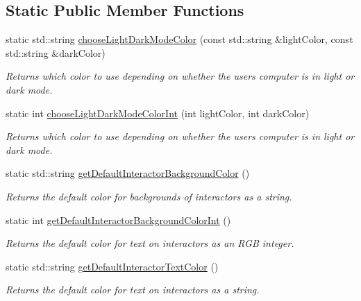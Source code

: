 \subsection*{Static Public Member Functions}
\begin{DoxyCompactItemize}
\item 
static std\+::string \mbox{\hyperlink{classsgl_1_1GWindow_a14da494e7a105db49b15cbd11db68774}{choose\+Light\+Dark\+Mode\+Color}} (const std\+::string \&light\+Color, const std\+::string \&dark\+Color)
\begin{DoxyCompactList}\small\item\em Returns which color to use depending on whether the user\textquotesingle{}s computer is in light or dark mode. \end{DoxyCompactList}\item 
static int \mbox{\hyperlink{classsgl_1_1GWindow_a8364f5a4c8622d07ccc83bdc3acc4f19}{choose\+Light\+Dark\+Mode\+Color\+Int}} (int light\+Color, int dark\+Color)
\begin{DoxyCompactList}\small\item\em Returns which color to use depending on whether the user\textquotesingle{}s computer is in light or dark mode. \end{DoxyCompactList}\item 
static std\+::string \mbox{\hyperlink{classsgl_1_1GWindow_a43cda7f9c8a6eb4ff1519fb99a3c2901}{get\+Default\+Interactor\+Background\+Color}} ()
\begin{DoxyCompactList}\small\item\em Returns the default color for backgrounds of interactors as a string. \end{DoxyCompactList}\item 
static int \mbox{\hyperlink{classsgl_1_1GWindow_a04e520567df471df236f1efeb5ea4d90}{get\+Default\+Interactor\+Background\+Color\+Int}} ()
\begin{DoxyCompactList}\small\item\em Returns the default color for text on interactors as an R\+GB integer. \end{DoxyCompactList}\item 
static std\+::string \mbox{\hyperlink{classsgl_1_1GWindow_aa65fc0c6ac0c5ebeafffe99e35face97}{get\+Default\+Interactor\+Text\+Color}} ()
\begin{DoxyCompactList}\small\item\em Returns the default color for text on interactors as a string. \end{DoxyCompactList}\item 

\end{DoxyCompactItemize}
